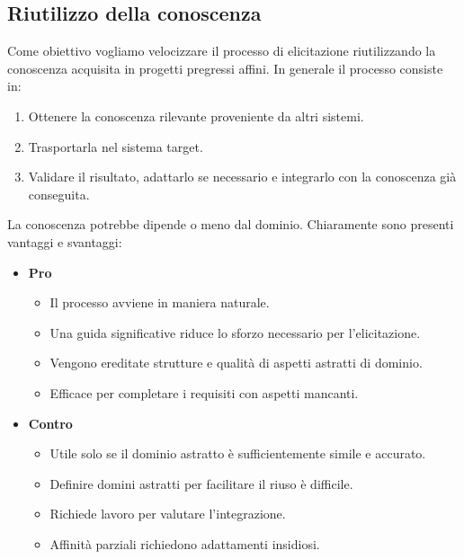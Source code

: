 \documentclass[../main.tex]{subfiles}
\begin{document}
\subsection{Riutilizzo della conoscenza}
Come obiettivo vogliamo velocizzare il processo di elicitazione riutilizzando la conoscenza acquisita in progetti pregressi affini.
In generale il processo consiste in:
\begin{enumerate}
	\item Ottenere la conoscenza rilevante proveniente da altri sistemi.
	\item Trasportarla nel sistema target.
	\item Validare il risultato, adattarlo se necessario e integrarlo con la conoscenza già conseguita. 
\end{enumerate}
La conoscenza potrebbe dipende o meno dal dominio. Chiaramente sono presenti vantaggi e svantaggi:
\begin{itemize}
	\item \textbf{Pro}
	\begin{itemize}
		\item Il processo avviene in maniera naturale.
		\item Una guida significative riduce lo sforzo necessario per l'elicitazione.
		\item Vengono ereditate strutture e qualità di aspetti astratti di dominio.
		\item Efficace per completare i requisiti con aspetti mancanti.
	\end{itemize}
	\item \textbf{Contro}
	\begin{itemize}
		\item Utile solo se il dominio astratto è sufficientemente simile e accurato.
		\item Definire domini astratti per facilitare il riuso è difficile.
		\item Richiede lavoro per valutare l'integrazione.
		\item Affinità parziali richiedono adattamenti insidiosi.
	\end{itemize}
\end{itemize}
\end{document}
